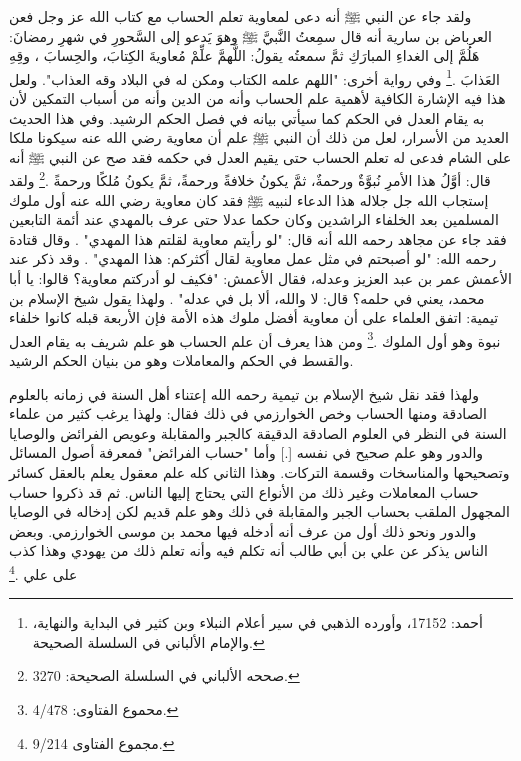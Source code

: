 ولقد جاء عن النبي ﷺ أنه دعى لمعاوية تعلم الحساب مع كتاب الله عز وجل فعن العرباض بن سارية أنه قال سمِعتُ النَّبيَّ ﷺ وهوَ يَدعو إلى السَّحورِ في شهرِ رمضانَ: هَلُمَّ إلى الغداءِ المبارَكِ ثمَّ سمعتُه يقولُ: اللَّهمَّ علِّمْ مُعاويةَ الكِتابَ، والحِسابَ ، وقِهِ العَذابَ \href{https://shamela.ws/book/25794/13683#p2}{\faExternalLink}\href{https://shamela.ws/book/22669/1909#p2}{\faExternalLink}\href{https://shamela.ws/book/4445/6628#p1}{\faExternalLink}\href{https://shamela.ws/book/9442/5496#p12}{\faExternalLink} \cite{ahmid}\cite{dahabi_Siyar}\cite{ibnKathir_AlBidayah}\cite{albani_Sahiha}.\footnote{أحمد: 17152، وأورده الذهبي في سير أعلام النبلاء وبن كثير في البداية والنهاية، والإمام الألباني في السلسلة الصحيحة.} وفي رواية أخرى: "اللهم علمه الكتاب ومكن له في البلاد وقه العذاب". ولعل هذا فيه الإشارة الكافية لأهمية علم الحساب وأنه من الدين وأنه من أسباب التمكين لأن به يقام العدل في الحكم كما سيأتي بيانه في فصل الحكم الرشيد. وفي هذا الحديث العديد من الأسرار، لعل من ذلك أن النبي ﷺ علم أن معاوية رضي الله عنه سيكونا ملكا على الشام فدعى له تعلم الحساب حتى يقيم العدل في حكمه فقد صح عن النبي ﷺ أنه قال: أوَّلُ هذا الأمرِ نُبوَّةٌ ورحمةٌ، ثمَّ يكونُ خلافةً ورحمةً، ثمَّ يكونُ مُلكًا ورحمةً \href{https://shamela.ws/book/9442/5496#p12}{\faExternalLink} \cite{albani_Sahiha}.\footnote{صححه الألباني في السلسلة الصحيحة: 3270.} ولقد إستجاب الله جل جلاله هذا الدعاء لنبيه ﷺ فقد كان معاوية رضي الله عنه أول ملوك المسلمين بعد الخلفاء الراشدين وكان حكما عدلا حتى عرف بالمهدي عند أئمة التابعين فقد جاء عن مجاهد رحمه الله أنه قال: "لو رأيتم معاوية لقلتم هذا المهدي" \href{https://shamela.ws/book/1077/702#p1}{\faExternalLink}. وقال قتادة رحمه الله: "لو أصبحتم في مثل عمل معاوية لقال أكثركم: هذا المهدي" \href{https://shamela.ws/book/1077/701#p1}{\faExternalLink}. وقد ذكر عند الأعمش عمر بن عبد العزيز وعدله، فقال الأعمش: "فكيف لو أدركتم معاوية؟ قالوا: يا أبا محمد، يعني في حلمه؟ قال: لا والله، ألا بل في عدله" \href{https://shamela.ws/book/1077/700#p1}{\faExternalLink}\href{https://shamela.ws/book/927/3063#p3}{\faExternalLink}. ولهذا يقول شيخ الإسلام بن تيمية: اتفق العلماء على أن معاوية أفضل ملوك هذه الأمة فإن الأربعة قبله كانوا خلفاء نبوة وهو أول الملوك \href{https://shamela.ws/book/7289/1800#p1}{\faExternalLink} \cite{ibnTaimia_Majmoo}.\footnote{محموع الفتاوى: 4/478.} ومن هذا يعرف أن علم الحساب هو علم شريف به يقام العدل والقسط في الحكم والمعاملات وهو من بنيان الحكم الرشيد.

ولهذا فقد نقل شيخ الإسلام بن تيمية رحمه الله إعتناء أهل السنة في زمانه بالعلوم الصادقة ومنها الحساب وخص الخوارزمي في ذلك فقال: ولهذا يرغب كثير من علماء السنة في النظر في العلوم الصادقة الدقيقة كالجبر والمقابلة وعويص الفرائض والوصايا والدور وهو علم صحيح في نفسه [.] وأما "حساب الفرائض" فمعرفة أصول المسائل وتصحيحها والمناسخات وقسمة التركات. وهذا الثاني كله علم معقول يعلم بالعقل كسائر حساب المعاملات وغير ذلك من الأنواع التي يحتاج إليها الناس. ثم قد ذكروا حساب المجهول الملقب بحساب الجبر والمقابلة في ذلك وهو علم قديم لكن إدخاله في الوصايا والدور ونحو ذلك أول من عرف أنه أدخله فيها محمد بن موسى الخوارزمي. وبعض الناس يذكر عن علي بن أبي طالب أنه تكلم فيه وأنه تعلم ذلك من يهودي وهذا كذب على علي
\href{https://shamela.ws/book/7289/4478#p2}{\faExternalLink} \cite{ibnTaimia_Majmoo}.\footnote{مجموع الفتاوى 9/214.} 

